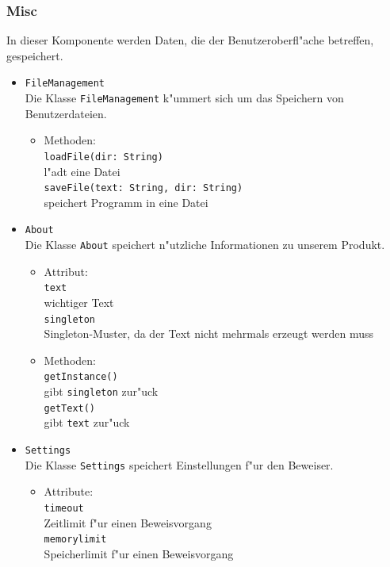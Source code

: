 \documentclass[10pt,a4paper,titlepage]{article}
\begin{document}
\subsubsection{Misc}

In dieser Komponente werden Daten, die der Benutzeroberfl"ache betreffen, gespeichert. 
\begin{itemize}
\item \texttt{FileManagement} \\
Die Klasse \texttt{FileManagement} k"ummert sich um das Speichern von Benutzerdateien. 
\begin{itemize}
\item Methoden: \\
\texttt{loadFile(dir: String)} \\
l"adt eine Datei \\
\texttt{saveFile(text: String, dir: String)} \\
speichert Programm in eine Datei 
\end{itemize}
\item \texttt{About} \\
Die Klasse \texttt{About} speichert n"utzliche Informationen zu unserem Produkt. 
\begin{itemize}
\item Attribut: \\
\texttt{text} \\
wichtiger Text \\
\texttt{singleton} \\
Singleton-Muster, da der Text nicht mehrmals erzeugt werden muss 
\item Methoden: \\
\texttt{getInstance()} \\
gibt \texttt{singleton} zur"uck \\
\texttt{getText()} \\
gibt \texttt{text} zur"uck
\end{itemize}
\item \texttt{Settings} \\
Die Klasse \texttt{Settings} speichert Einstellungen f"ur den Beweiser. 
\begin{itemize}
\item Attribute: \\
\texttt{timeout} \\
Zeitlimit f"ur einen Beweisvorgang \\
\texttt{memorylimit} \\
Speicherlimit f"ur einen Beweisvorgang 
\end{itemize}
\end{itemize}
\end{document}
